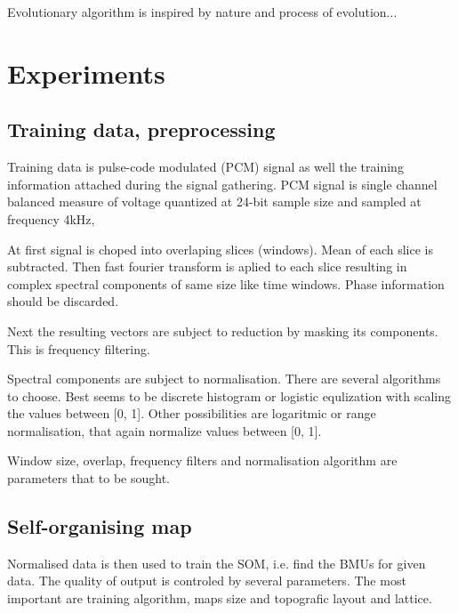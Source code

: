 \documentclass[a4paper,journal]{IEEEtran}
\begin{document}
Evolutionary algorithm is inspired by nature and process of evolution...


\section{Experiments}
\subsection{Training data, preprocessing}
Training data is pulse-code modulated (PCM) signal as well the training 
information attached during the signal gathering.
PCM signal is single channel balanced measure of voltage
quantized at 24-bit sample size
and sampled at frequency 4kHz,

At first signal is choped into overlaping slices (windows).
Mean of each slice is subtracted.
Then fast fourier transform is aplied to each slice resulting in
complex spectral components of same size like time windows.
Phase information should be discarded.

Next the resulting vectors are subject to reduction by masking its components.
This is frequency filtering.

Spectral components are subject to normalisation.
There are several algorithms to choose. Best seems to be 
discrete histogram or logistic equlization with scaling the values between [0, 1].
Other possibilities are logaritmic or range normalisation, that again normalize
values between [0, 1].

Window size, overlap, frequency filters and normalisation algorithm 
are parameters that to be sought.

\subsection{Self-organising map}
Normalised data is then used to train the SOM, i.e. find the BMUs for given data.
The quality of output is controled by several parameters. The most important are 
training algorithm, maps size and topografic layout and lattice.
\end{document}
